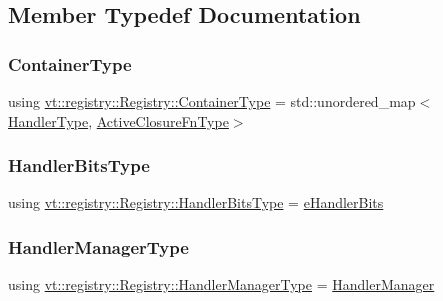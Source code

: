 \subsection{Member Typedef Documentation}
\mbox{\label{structvt_1_1registry_1_1_registry_ac9e1297d26b6c553ccdaa46858cdb3b8}} 
\subsubsection{\texorpdfstring{Container\+Type}{ContainerType}}
{\footnotesize\ttfamily using \hyperlink{structvt_1_1registry_1_1_registry_ac9e1297d26b6c553ccdaa46858cdb3b8}{vt\+::registry\+::\+Registry\+::\+Container\+Type} =  std\+::unordered\+\_\+map$<$\hyperlink{namespacevt_af64846b57dfcaf104da3ef6967917573}{Handler\+Type}, \hyperlink{namespacevt_a2a06c34cafcd511828f16cbf1476b924}{Active\+Closure\+Fn\+Type}$>$}

\mbox{\label{structvt_1_1registry_1_1_registry_acf13f3553c4f5c82dd9bd1cb716d435f}} 
\subsubsection{\texorpdfstring{Handler\+Bits\+Type}{HandlerBitsType}}
{\footnotesize\ttfamily using \hyperlink{namespacevt_af182285b57b225b163d5d8aff03cb8c2}{vt\+::registry\+::\+Registry\+::\+Handler\+Bits\+Type} =  \hyperlink{namespacevt_af182285b57b225b163d5d8aff03cb8c2}{e\+Handler\+Bits}}

\mbox{\label{structvt_1_1registry_1_1_registry_a0717ad6519a3d2c6f3e1848182db4bfa}} 
\subsubsection{\texorpdfstring{Handler\+Manager\+Type}{HandlerManagerType}}
{\footnotesize\ttfamily using \hyperlink{structvt_1_1registry_1_1_registry_a0717ad6519a3d2c6f3e1848182db4bfa}{vt\+::registry\+::\+Registry\+::\+Handler\+Manager\+Type} =  \hyperlink{structvt_1_1_handler_manager}{Handler\+Manager}}

